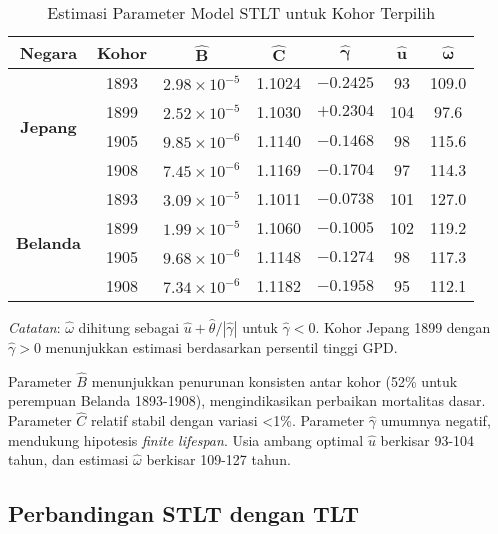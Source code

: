 \begin{table}[H]
\centering
\caption{Estimasi Parameter Model STLT untuk Kohor Terpilih}
\label{tab:stlt_params_selected_cohorts}
\small
\begin{tabular}{ccccccc}
\hline
\textbf{Negara} & \textbf{Kohor} & $\boldsymbol{\hat{B}}$ & $\boldsymbol{\hat{C}}$ & $\boldsymbol{\hat{\gamma}}$ & $\boldsymbol{\hat{u}}$ & $\boldsymbol{\hat{\omega}}$ \\
\hline
\multirow{4}{*}{\textbf{Jepang}}
& 1893 & $2.98 \times 10^{-5}$ & 1.1024 & $-0.2425$ & 93 & 109.0 \\
& 1899 & $2.52 \times 10^{-5}$ & 1.1030 & $+0.2304$ & 104 & 97.6 \\
& 1905 & $9.85 \times 10^{-6}$ & 1.1140 & $-0.1468$ & 98 & 115.6 \\
& 1908 & $7.45 \times 10^{-6}$ & 1.1169 & $-0.1704$ & 97 & 114.3 \\
\hline
\multirow{4}{*}{\textbf{Belanda}}
& 1893 & $3.09 \times 10^{-5}$ & 1.1011 & $-0.0738$ & 101 & 127.0 \\
& 1899 & $1.99 \times 10^{-5}$ & 1.1060 & $-0.1005$ & 102 & 119.2 \\
& 1905 & $9.68 \times 10^{-6}$ & 1.1148 & $-0.1274$ & 98 & 117.3 \\
& 1908 & $7.34 \times 10^{-6}$ & 1.1182 & $-0.1958$ & 95 & 112.1 \\
\hline
\end{tabular}
\begin{tablenotes}
\small
\item \textit{Catatan}: $\hat{\omega}$ dihitung sebagai $\hat{u} + \hat{\theta}/|\hat{\gamma}|$ untuk $\hat{\gamma} < 0$. Kohor Jepang 1899 dengan $\hat{\gamma} > 0$ menunjukkan estimasi berdasarkan persentil tinggi GPD.
\end{tablenotes}
\end{table}

Parameter $\hat{B}$ menunjukkan penurunan konsisten antar kohor (52\% untuk perempuan Belanda 1893-1908), mengindikasikan perbaikan mortalitas dasar. Parameter $\hat{C}$ relatif stabil dengan variasi <1\%. Parameter $\hat{\gamma}$ umumnya negatif, mendukung hipotesis \textit{finite lifespan}. Usia ambang optimal $\hat{u}$ berkisar 93-104 tahun, dan estimasi $\hat{\omega}$ berkisar 109-127 tahun.

\subsection{Perbandingan STLT dengan TLT}

